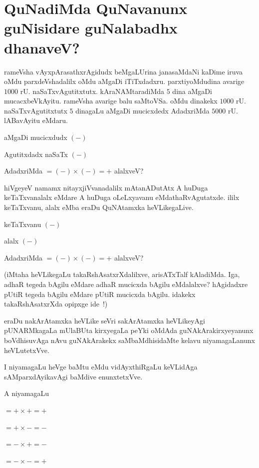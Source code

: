 \chapter{QuNadiMda QuNavanunx guNisidare guNalabadhx dhanaveV?}

rameVsha vAyxpArasathxrAgidudx beMgaLUrina janasaMdaNi kaDime iruva oMdu parxdeVshadalilx oMdu aMgaDi iTiTxdadxru. parxtiyoMdudina avarige $1000$ rU. naSaTxvAgutitxtutx.  kAraNAMtaradiMda $5$ dina aMgaDi mucacxbeVkAyitu. rameVsha avarige balu saMtoVSa. oMdu dinakekx $1000$ rU. naSaTxvAgutitxtutx $5$ dinagaLu aMgaDi mucicxdedx AdadxriMda $5000$ rU. lABavAyitu eMdaru. 

aMgaDi mucicxdudx $(-)$

Agutitxdadx naSaTx $(-)$

AdadxriMda $= (-) \times (-) = + $ alalxveV?

hiVgeyeV namamx nitayxjiVvanadalilx mAtanADutAtx A huDuga keTaTxvanalalx eMdare A huDuga oLeLxyavanu eMdathaRvAgutatxde. ililx keTaTxvanu, alalx eMba eraDu QuNAtamxka heVLikegaLive.

keTaTxvanu $(-)$

alalx $(-)$

AdadxriMda $= (-) \times  (-) = +$ alalxveV?

(iMtaha heVLikegaLu takaRshAsatxrXdalilxve, arisATxTalf kAladiMda. Iga, adhaR tegeda bAgilu eMdare adhaR mucicxda bAgilu eMdalalxve? hAgidadxre pUtiR tegeda bAgilu eMdare pUtiR mucicxda bAgilu. idakekx takaRshAsatxrXda opipxge ide~!)

eraDu nakArAtamxka heVLike seVri sakArAtamxka heVLikeyAgi pUNARMkagaLa mUlaBUta kirxyegaLa peYki oMdAda guNAkArakirxyeyanunx boVdhisuvAga nAvu guNAkArakekx saMbaMdhisidaMte kelavu niyamagaLanunx heVLutetxVve.

I niyamagaLu heVge baMtu eMdu vidAyxthiRgaLu keVLidAga sAMparxdAyikavAgi baMdive enunxtetxVve.

A niyamagaLu

$= + \times + = +$

$= + \times - = -$

$= - \times + = -$

$= - \times - = +$

